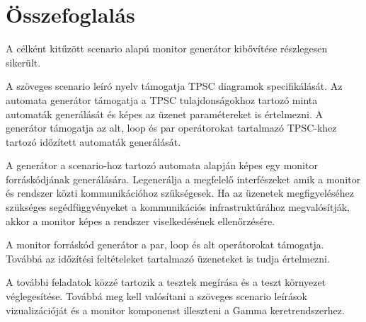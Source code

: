 \chapter{Összefoglalás}

A célként kitűzött scenario alapú monitor generátor kibővítése részlegesen sikerült.

A szöveges scenario leíró nyelv támogatja TPSC diagramok specifikálását. Az automata generátor támogatja a TPSC tulajdonságokhoz tartozó minta automaták generálását és képes az üzenet paramétereket is értelmezni. A generátor támogatja az alt, loop és par operátorokat tartalmazó TPSC-khez tartozó időzített automaták generálását.

A generátor a scenario-hoz tartozó automata alapján képes egy monitor forráskódjának generálására. Legenerálja a megfelelő interfészeket amik a monitor és rendszer közti kommunikációhoz szükségesek. Ha az üzenetek megfigyeléséhez szükséges segédfüggvényeket a kommunikációs infrastruktúrához megvalósítják, akkor a monitor képes a rendszer viselkedésének ellenőrzésére.

A monitor forráskód generátor a par, loop és alt operátorokat támogatja. Továbbá az időzítési feltételeket tartalmazó üzeneteket is tudja értelmezni.

A további feladatok közzé tartozik a tesztek megírása és a teszt környezet véglegesítése.
Továbbá meg kell valósítani a szöveges scenario leírások vizualizációját és a monitor komponenst illeszteni a Gamma keretrendszerhez.